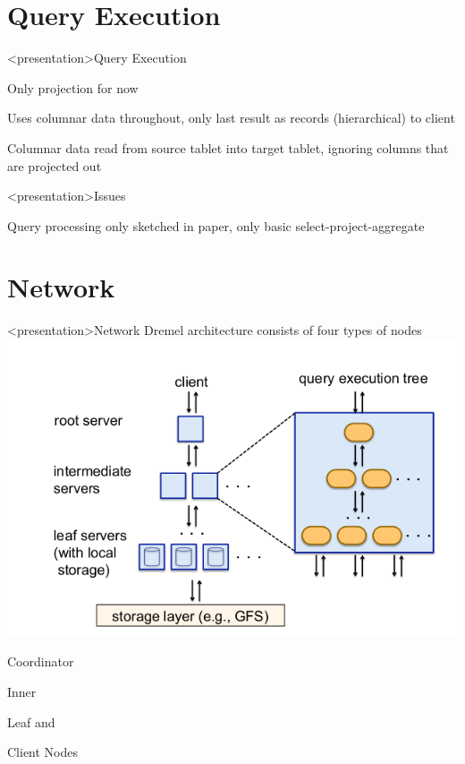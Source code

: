 \section{Query Execution}
\begin{frame}<presentation>{Query Execution}
\begin{niitemize}
 \item Only projection for now
 \item Uses columnar data throughout, only last result as
  records (hierarchical) to client
 \item Columnar data read from source tablet into target tablet, ignoring
  columns that are projected out
\end{niitemize}
\end{frame}

\begin{frame}<presentation>{Issues}
\begin{niitemize}
 \item Query processing only sketched in paper, only basic
  select-project-aggregate
\end{niitemize}
\end{frame}

\section{Network}
\begin{frame}<presentation>{Network}
  Dremel architecture consists of four types of nodes
  \includegraphics[width=.55\textwidth]{gfx/net-arch}
  \begin{niitemize}
    \item Coordinator
    \item Inner
    \item Leaf and
    \item Client Nodes
  \end{niitemize}
\end{frame}


